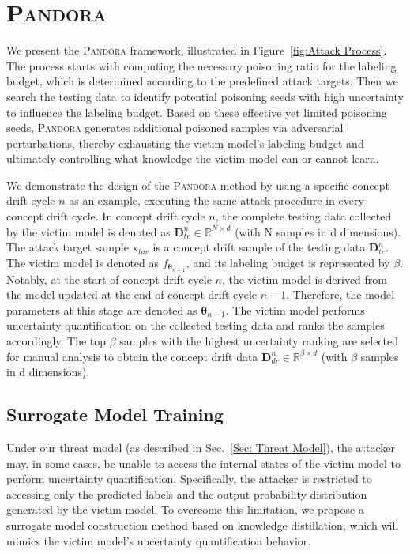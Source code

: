 \documentclass[lettersize,journal]{IEEEtran}
\newcommand{\pandora}{{\scshape Pandora}\xspace}
\begin{document}
\section{\pandora}
\label{Sec: Attack Method}

We present the \pandora framework, illustrated in Figure~\ref{fig:Attack Process}.
The process starts with computing the necessary poisoning ratio for the labeling budget, which is determined according to the predefined attack targets.
Then we search the testing data to identify potential poisoning seeds with high uncertainty to influence the labeling budget.
Based on these effective yet limited poisoning seeds, \pandora generates additional poisoned samples via adversarial perturbations, thereby exhausting the victim model’s labeling budget and ultimately controlling what knowledge the victim model can or cannot learn.

We demonstrate the design of the \pandora method by using a specific concept drift cycle $n$ as an example, executing the same attack procedure in every concept drift cycle.
In concept drift cycle $n$, the complete testing data collected by the victim model is denoted as $\bm{D}_{te}^{n} \in \mathbb{R}^{N \times d}$ (with N samples in d dimensions).
The attack target sample $\bm{\mathrm{x}}_{tar}$ is a concept drift sample of the testing data $\bm{D}_{te}^{n}$. 
The victim model is denoted as $f_{\bm{\theta}_{n-1}}$, and its labeling budget is represented by $\beta$.
Notably, at the start of concept drift cycle $n$, the victim model is derived from the model updated at the end of concept drift cycle $n-1$.
Therefore, the model parameters at this stage are denoted as $\bm{\theta}_{n-1}$.
The victim model performs uncertainty quantification on the collected testing data and ranks the samples accordingly.
The top $\beta$ samples with the highest uncertainty ranking are selected for manual analysis to obtain the concept drift data $\bm{D}_{dr}^{n} \in \mathbb{R}^{\beta \times d}$ (with $\beta$ samples in d dimensions).

\subsection{Surrogate Model Training}
Under our threat model (as described in Sec.~\ref{Sec: Threat Model}), the attacker may, in some cases, be unable to access the internal states of the victim model to perform uncertainty quantification.
Specifically, the attacker is restricted to accessing only the predicted labels and the output probability distribution generated by the victim model.
To overcome this limitation, we propose a surrogate model construction method based on knowledge distillation, which will mimics the victim model's uncertainty quantification behavior.
\end{document}
